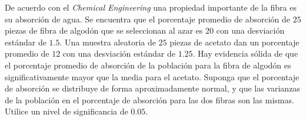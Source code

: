 \begin{enunciado}
 De acuerdo con el \textit{Chemical Engineering} una propiedad importante de la fibra es su absorci\'on de agua. Se encuentra que el porcentaje promedio de absorci\'on de $25$ piezas de fibra de algod\'on que se seleccionan al azar es $20$ con una desviaci\'on est\'andar de $1.5$. Una muestra aleatoria de $25$ piezas de acetato dan un porcentaje promedio de $12$ con una desviaci\'on est\'andar de $1.25$. Hay evidencia s\'olida de que el porcentaje promedio de absorci\'on de la poblaci\'on para la fibra de algod\'on es significativamente mayor que la media para el acetato. Suponga que el porcentaje de absorci\'on se distribuye de forma aproximadamente normal, y que las varianzas de la poblaci\'on en el porcentaje de absorci\'on para las dos fibras son las mismas. Utilice un nivel de significancia de $0.05$.
\end{enunciado}

